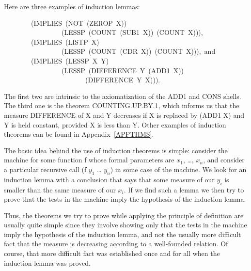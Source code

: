 \documentclass[11pt]{book}
\newenvironment{pubasis}{\begin{flushleft}\ttfamily\small}{\normalsize\rmfamily\end{flushleft}}
\begin{document}
Here are three examples of induction lemmas:
\begin{pubasis}
~~~~~~~~(IMPLIES~(NOT~(ZEROP~X))\\
~~~~~~~~~~~~~~~~~(LESSP~(COUNT~(SUB1~X))~(COUNT~X))),\\

~~~~~~~~(IMPLIES~(LISTP~X)\\
~~~~~~~~~~~~~~~~~(LESSP~(COUNT~(CDR~X))~(COUNT~X))),~and\\

~~~~~~~~(IMPLIES~(LESSP~X~Y)\\
~~~~~~~~~~~~~~~~~(LESSP~(DIFFERENCE~Y~(ADD1~X))\\
~~~~~~~~~~~~~~~~~~~~~~~~(DIFFERENCE~Y~X))).\\
\end{pubasis}
The first two are intrinsic to the axiomatization of the ADD1 and
CONS shells.  The third one is the theorem COUNTING.UP.BY.1, which informs us that the
measure DIFFERENCE of X and Y decreases if X is replaced by (ADD1 X) and
Y is held constant, provided X is less than Y.  Other
examples of induction theorems can be found in Appendix~\ref{APPTHMS}.

The basic idea behind the use of induction theorems is simple:
consider the machine for some function f whose formal
parameters are $x_{1}$, \ldots{}, $x_{n}$, and consider a particular recursive
call (f $y_{1}$ \ldots{} $y_{n}$) in some case of the machine.
We look for an induction lemma with
a conclusion that says that some measure of our $y_{i}$ is
smaller than the same measure of our $x_{i}$.  If we find such
a lemma we  then try to prove that the tests in the machine imply the
hypothesis of the induction lemma.

Thus, the theorems we 
try to prove while applying the principle of definition
are usually quite simple since they
involve showing only that the tests in the machine imply the
hypothesis of the induction lemma, and not the usually more difficult fact that
the measure is decreasing according to a well-founded relation.
Of course, that more difficult fact was established once and for all
when the induction lemma was proved.
\end{document}
